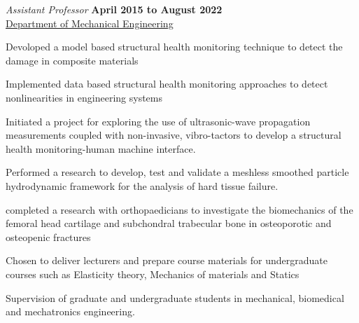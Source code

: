 \documentclass[10pt]{article}
\begin{document}
        
    \item[] \textit{Assistant Professor}%
            \hfill \textbf{April 2015 to August 2022}\\
            \href{https://me.ege.edu.tr/eng-/Homepage.html}{Department of Mechanical Engineering}
           \begin{innerlist}
           \item Devoloped a model based structural health monitoring
           		technique to detect the damage in composite materials
           
           \item Implemented data based structural health monitoring approaches
           	to detect nonlinearities in engineering systems
           
			\item Initiated a project for exploring the 
				use of ultrasonic-wave propagation measurements coupled 
				with non-invasive, vibro-tactors to develop a structural 
				health monitoring-human machine interface. 

			\item Performed a research to develop, test and validate
				a meshless smoothed particle hydrodynamic framework for the
				analysis of hard tissue failure.

			\item completed a research with orthopaedicians to investigate the 
				biomechanics of the femoral head cartilage and subchondral trabecular bone in
				osteoporotic and osteopenic fractures

            \item Chosen to deliver lecturers and prepare course 
                materials for undergraduate courses such as Elasticity theory,
                Mechanics of materials and Statics 
            
             \item Supervision of graduate and undergraduate students
                in mechanical, biomedical and mechatronics engineering.
            \end{innerlist}
\end{document}
